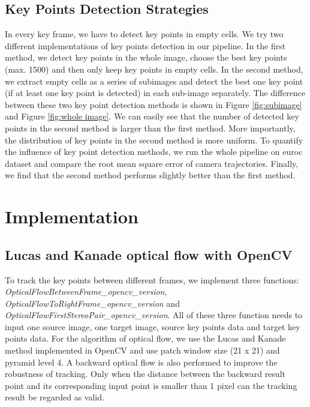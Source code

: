\documentclass{easychair}
\begin{document}
\subsection{Key Points Detection Strategies}
In every key frame, we have to detect key points in empty cells. We try two different implementations of key points detection in our pipeline. In the first method, we detect key points in the whole image, choose the best key points (max. 1500) and then only keep key points in empty cells. In the second method, we extract empty cells as a series of subimages and detect the best one key point (if at least one key point is detected) in each sub-image separately. %
The difference between these two key point detection methods is shown in Figure \ref{fig:subimage} and Figure \ref{fig:whole image}. We can easily see that the number of detected key points in the second method is larger than the first method. More importantly, the distribution of key points in the second method is more uniform. To quantify the influence of key point detection methods, we run the whole pipeline on euroc dataset and compare the root mean square error of camera trajectories. Finally, we find that the second method performs slightly better than the first method.




\section{Implementation}
\subsection{Lucas and Kanade optical flow with OpenCV}
To track the key points between different frames, we implement three functions: \emph{OpticalFlowBetweenFrame\_opencv\_version}, \emph{OpticalFlowToRightFrame\_opencv\_version} and \emph{OpticalFlowFirstStereoPair\_opencv\_version}. All of these three function needs to input one source image, one target image, source key points data and target key points data. For the algorithm of optical flow, we use the Lucas and Kanade method implemented in OpenCV and use patch window size (21 x 21) and pyramid level 4. A backward optical flow is also performed to improve the robustness of tracking. Only when the distance between the backward result point and its corresponding input point is smaller than 1 pixel can the tracking result be regarded as valid. \\
\end{document}
